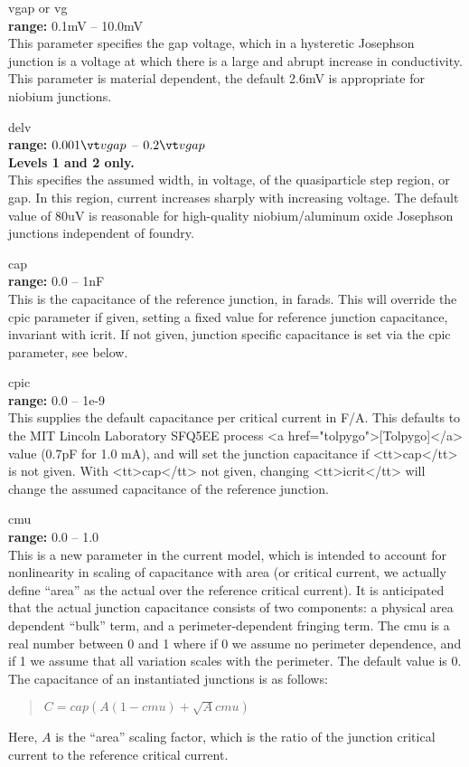 \begin{description}
\item{{\vt vgap} or {\vt vg}}\\
{\bf range:} 0.1mV -- 10.0mV\\
This parameter specifies the gap voltage, which in a hysteretic
Josephson junction is a voltage at which there is a large and abrupt
increase in conductivity.  This parameter is material dependent, the
default 2.6mV is appropriate for niobium junctions.

\item{\vt delv}\\
{\bf range:} $0.001{\vt vgap}$ -- $0.2{\vt vgap}$\\
{\bf Levels 1 and 2 only.}\\
This specifies the assumed width, in voltage, of the quasiparticle
step region, or gap.  In this region, current increases sharply with
increasing voltage.  The default value of 80uV is reasonable for
high-quality niobium/aluminum oxide Josephson junctions independent of
foundry.

\item{\vt cap}\\
{\bf range:} 0.0 -- 1nF\\
This is the capacitance of the reference junction, in farads.  This
will override the {\vt cpic} parameter if given, setting a fixed value
for reference junction capacitance, invariant with {\vt icrit}.  If
not given, junction specific capacitance is set via the {\vt cpic}
parameter, see below.

\item{\vt cpic}\\
{\bf range:} 0.0 -- 1e-9\\
This supplies the default capacitance per critical current in F/A. 
This defaults to the MIT Lincoln Laboratory SFQ5EE process <a
href="tolpygo">[Tolpygo]</a> value (0.7pF for 1.0 mA), and will set
the junction capacitance if <tt>cap</tt> is not given.  With
<tt>cap</tt> not given, changing <tt>icrit</tt> will change the
assumed capacitance of the reference junction.

\item{\vt cmu}\\
{\bf range:} 0.0 -- 1.0\\
This is a new parameter in the current model, which is intended to
account for nonlinearity in scaling of capacitance with area (or
critical current, we actually define ``area'' as the actual over the
reference critical current).  It is anticipated that the actual
junction capacitance consists of two components:  a physical area
dependent ``bulk'' term, and a perimeter-dependent fringing term.  The
{\vt cmu} is a real number between 0 and 1 where if 0 we assume no
perimeter dependence, and if 1 we assume that all variation scales
with the perimeter.  The default value is 0.  The capacitance of an
instantiated junctions is as follows:
\begin{quote}
$C = cap (A(1-cmu) + \sqrt{A} cmu)$
\end{quote}
Here, $A$ is the ``area'' scaling factor, which is the ratio of the
junction critical current to the reference critical current.


\end{description}
